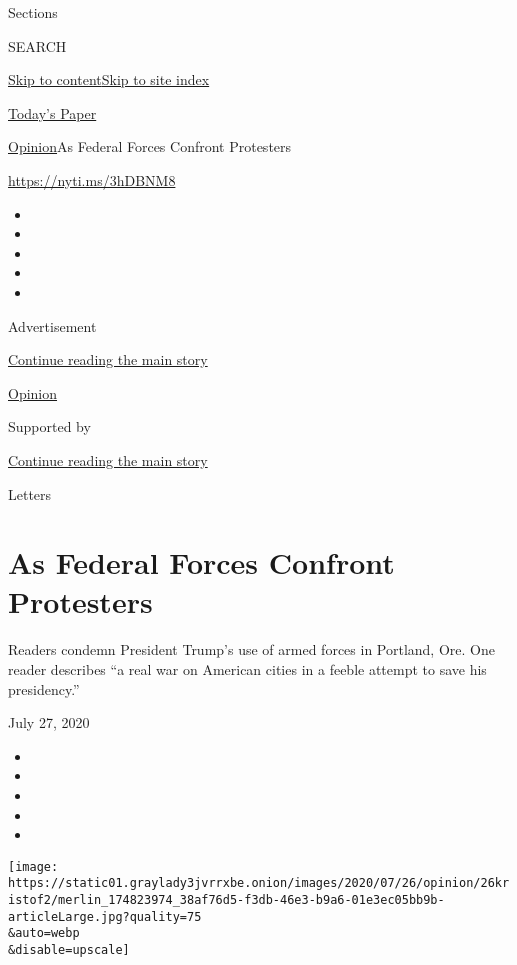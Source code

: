 Sections

SEARCH

\protect\hyperlink{site-content}{Skip to
content}\protect\hyperlink{site-index}{Skip to site index}

\href{https://myaccount.nytimes3xbfgragh.onion/auth/login?response_type=cookie\&client_id=vi}{}

\href{https://www.nytimes3xbfgragh.onion/section/todayspaper}{Today's
Paper}

\href{/section/opinion}{Opinion}\textbar{}As Federal Forces Confront
Protesters

\url{https://nyti.ms/3hDBNM8}

\begin{itemize}
\item
\item
\item
\item
\item
\end{itemize}

Advertisement

\protect\hyperlink{after-top}{Continue reading the main story}

\href{/section/opinion}{Opinion}

Supported by

\protect\hyperlink{after-sponsor}{Continue reading the main story}

Letters

\hypertarget{as-federal-forces-confront-protesters}{%
\section{As Federal Forces Confront
Protesters}\label{as-federal-forces-confront-protesters}}

Readers condemn President Trump's use of armed forces in Portland, Ore.
One reader describes ``a real war on American cities in a feeble attempt
to save his presidency.''

July 27, 2020

\begin{itemize}
\item
\item
\item
\item
\item
\end{itemize}

\texttt{[image: https://static01.graylady3jvrrxbe.onion/images/2020/07/26/opinion/26kristof2/merlin\_174823974\_38af76d5-f3db-46e3-b9a6-01e3ec05bb9b-articleLarge.jpg?quality=75\\\&auto=webp\\\&disable=upscale]}


